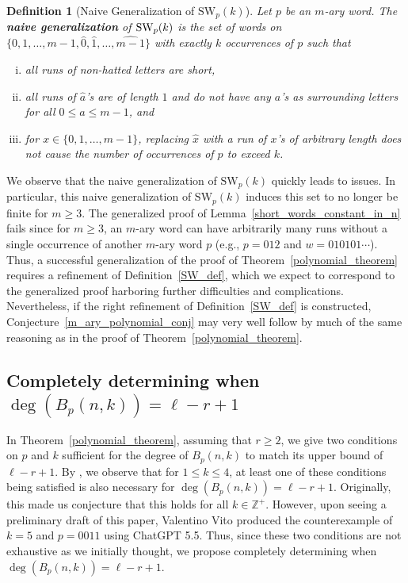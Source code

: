 \documentclass[11pt]{amsart}
\newtheorem{definition}[theorem]{Definition}
\newcommand{\ZZ}{\mathbb{Z}}
\newcommand{\hatted}[1]{\widehat{#1}}
\begin{document}
\begin{definition}[Naive Generalization of $\text{SW}_p(k)$]
    Let $p$ be an $m$-ary word. The \textbf{naive generalization} of $\text{\normalfont SW}_p(k)$ is the set of words on $\{0,1,\dots,m-1,\hatted{0},\hatted{1},\dots,\hatted{m-1}\}$ with exactly $k$ occurrences of $p$ such that
    \begin{enumerate}[(i)]
        \item all runs of non-hatted letters are short,
        \item all runs of $\hatted{a}$'s are of length $1$ and do not have any $a$'s as surrounding letters for all $0\leq a\leq m-1$, and
        \item for $x\in\{0,1,\dots,m-1\}$, replacing $\hatted{x}$ with a run of $x$'s of arbitrary length does not cause the number of occurrences of $p$ to exceed $k$.
    \end{enumerate}
\end{definition}

We observe that the naive generalization of $\text{SW}_p(k)$ quickly leads to issues. In particular, this naive generalization of $\text{SW}_p(k)$ induces this set to no longer be finite for $m\geq3$. The generalized proof of Lemma~\ref{short_words_constant_in_n} fails since for $m\geq3$, an $m$-ary word can have arbitrarily many runs without a single occurrence of another $m$-ary word $p$ (e.g., $p=012$ and $w=010101\cdots$). Thus, a successful generalization of the proof of Theorem~\ref{polynomial_theorem} requires a refinement of Definition~\ref{SW_def}, which we expect to correspond to the generalized proof harboring further difficulties and complications. Nevertheless, if the right refinement of Definition~\ref{SW_def} is constructed, Conjecture~\ref{m_ary_polynomial_conj} may very well follow by much of the same reasoning as in the proof of Theorem~\ref{polynomial_theorem}.

\subsection{Completely determining when $\deg(B_p(n,k))=\ell-r+1$}\label{second_part_section}

In Theorem~\ref{polynomial_theorem}, assuming that $r\geq2$, we give two conditions on $p$ and $k$ sufficient for the degree of $B_p(n,k)$ to match its upper bound of $\ell-r+1$. By \cite[Propositions 3.2, 3.4, 3.8, 3.11]{subseq_freq}, we observe that for $1\leq k\leq4$, at least one of these conditions being satisfied is also necessary for $\deg(B_p(n,k))=\ell-r+1$. Originally, this made us conjecture that this holds for all $k\in\ZZ^+$. However, upon seeing a preliminary draft of this paper, Valentino Vito \cite{vito_communication} produced the counterexample of $k=5$ and $p=0011$ using ChatGPT 5.5. Thus, since these two conditions are not exhaustive as we initially thought, we propose completely determining when $\deg(B_p(n,k))=\ell-r+1$.
\end{document}
